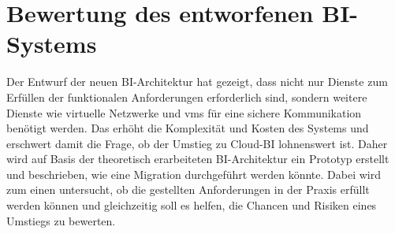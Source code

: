 \chapter{Bewertung des entworfenen BI-Systems} \label{ch:praktischeUmsetzung}
Der Entwurf der neuen BI-Architektur hat gezeigt, dass nicht nur Dienste zum Erfüllen der funktionalen Anforderungen erforderlich sind, sondern weitere Dienste wie virtuelle Netzwerke und \acp{vm} für eine sichere Kommunikation benötigt werden. Das erhöht die Komplexität und Kosten des Systems und erschwert damit die Frage, ob der Umstieg zu Cloud-BI lohnenswert ist. Daher wird auf Basis der theoretisch erarbeiteten BI-Architektur ein Prototyp erstellt und beschrieben, wie eine Migration durchgeführt werden könnte. Dabei wird zum einen untersucht, ob die gestellten Anforderungen in der Praxis erfüllt werden können und gleichzeitig soll es helfen, die Chancen und Risiken eines Umstiegs zu bewerten.




